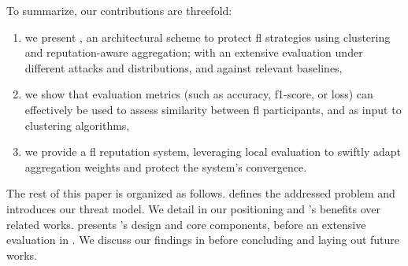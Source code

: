 To summarize, our contributions are threefold:
\begin{enumerate}[label=({\arabic*})]
    \item we present \thecontrib, an architectural scheme to protect \gls{fl} strategies using clustering and reputation-aware aggregation; with an extensive evaluation under different attacks and distributions, and against relevant baselines,
    \item we show that evaluation metrics (such as accuracy, f1-score, or loss) can effectively be used to assess similarity between \gls{fl} participants, and as input to clustering algorithms,
    \item we provide a \gls{fl} reputation system, leveraging local evaluation to swiftly adapt aggregation weights and protect the system's convergence.
\end{enumerate}

The rest of this paper is organized as follows.
 defines the addressed problem and introduces our threat model.
We detail in  our positioning and \thecontrib's benefits over related works.
 presents \thecontrib's design and core components, before an extensive evaluation in .
We discuss our findings in  before concluding and laying out future works.




%














